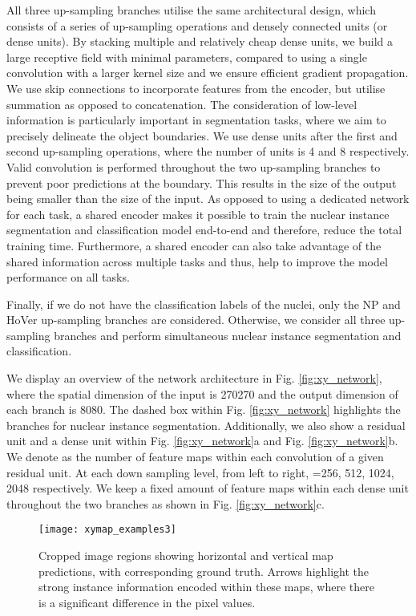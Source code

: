 \documentclass[journal]{IEEEtran}
\begin{document}
    All three up-sampling branches utilise the same architectural design, which consists of a series of up-sampling operations and densely connected units \cite{densenet} (or dense units). By stacking multiple and relatively cheap dense units, we build a large receptive field with minimal parameters, compared to using a single convolution with a larger kernel size and we ensure efficient gradient propagation. We use skip connections \cite{ronneberger2015u} to incorporate features from the encoder, but utilise summation as opposed to concatenation. The consideration of low-level information is particularly important in segmentation tasks, where we aim to precisely delineate the object boundaries. We use dense units after the first and second up-sampling operations, where the number of units is 4 and 8 respectively. Valid convolution is performed throughout the two up-sampling branches to prevent poor predictions at the boundary. This results in the size of the output being smaller than the size of the input. As opposed to using a dedicated network for each task, a shared encoder makes it possible to train the nuclear instance segmentation and classification model end-to-end and therefore, reduce the total training time. Furthermore, a shared encoder can also take advantage of the shared information across multiple tasks and thus, help to improve the model performance on all tasks. 
    
    Finally, if we do not have the classification labels of the nuclei, only the NP and HoVer up-sampling branches are considered. Otherwise, we consider all three up-sampling branches and perform simultaneous nuclear instance segmentation and classification. 
    
    We display an overview of the network architecture in Fig. \ref{fig:xy_network}, where the spatial dimension of the input is 270270 and the output dimension of each branch is 8080. The dashed box within Fig. \ref{fig:xy_network} highlights the branches for nuclear instance segmentation. Additionally, we also show a residual unit and a dense unit within Fig. \ref{fig:xy_network}a and Fig. \ref{fig:xy_network}b. We denote  as the number of feature maps within each convolution of a given residual unit. At each down sampling level, from left to right, =256, 512, 1024, 2048 respectively. We keep a fixed amount of feature maps within each dense unit throughout the two branches as shown in Fig. \ref{fig:xy_network}c.

		\begin{figure*}[!t]
		\centering
		\texttt{[image: xymap\_examples3]}
		\caption{Cropped image regions showing horizontal and vertical map predictions, with corresponding ground truth. Arrows highlight the strong instance information encoded within these maps, where there is a significant difference in the pixel values.}
		\label{fig:xy_output}
	\end{figure*}
	
\end{document}
